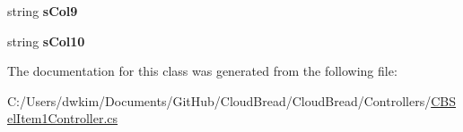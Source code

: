 \begin{DoxyCompactItemize}
\item 
string {\bfseries s\+Col9}\hypertarget{a00157_a2abcf097bdf77233afb9ef46b87e37ed}{}\label{a00157_a2abcf097bdf77233afb9ef46b87e37ed}

\item 
string {\bfseries s\+Col10}\hypertarget{a00157_a18922ae26284cb989c294db037cb019c}{}\label{a00157_a18922ae26284cb989c294db037cb019c}

\end{DoxyCompactItemize}


The documentation for this class was generated from the following file\+:\begin{DoxyCompactItemize}
\item 
C\+:/\+Users/dwkim/\+Documents/\+Git\+Hub/\+Cloud\+Bread/\+Cloud\+Bread/\+Controllers/\hyperlink{a00219}{C\+B\+Sel\+Item1\+Controller.\+cs}\end{DoxyCompactItemize}
